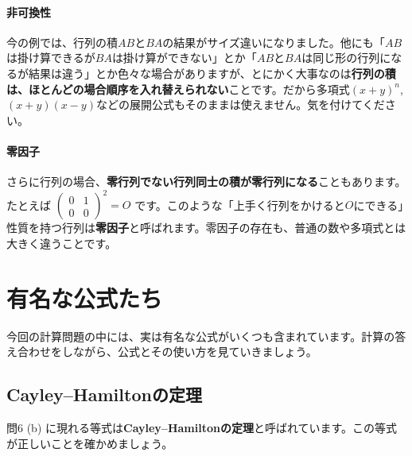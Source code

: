 \paragraph{非可換性}

今の例では、行列の積$AB$と$BA$の結果がサイズ違いになりました。他にも「$AB$は掛け算できるが$BA$は掛け算ができない」とか「$AB$と$BA$は同じ形の行列になるが結果は違う」とか色々な場合がありますが、とにかく大事なのは\textbf{行列の積は、ほとんどの場合順序を入れ替えられない}ことです。だから多項式$(x+y)^n$, $(x+y)(x-y)$などの展開公式もそのままは使えません。気を付けてください。

\paragraph{零因子}
さらに行列の場合、\textbf{零行列でない行列同士の積が零行列になる}こともあります。たとえば
$\begin{pmatrix}
0 & 1 \\
0 & 0 
\end{pmatrix}^2 = O$
です。このような「上手く行列をかけると$O$にできる」性質を持つ行列は\textbf{零因子}と呼ばれます。零因子の存在も、普通の数や多項式とは大きく違うことです。

\section{有名な公式たち}

今回の計算問題の中には、実は有名な公式がいくつも含まれています。計算の答え合わせをしながら、公式とその使い方を見ていきましょう。

\subsection{Cayley--Hamiltonの定理}

問6 (b) に現れる等式は\textbf{Cayley--Hamiltonの定理}と呼ばれています。この等式が正しいことを確かめましょう。

